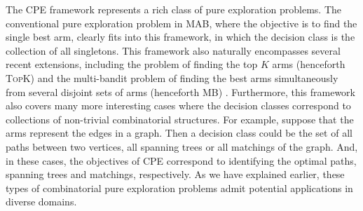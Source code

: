 \documentclass{article}
\newcommand{\Problem}{{CPE}\xspace}
\newcommand{\MultiIdent}{\textsc{TopK}\xspace}
\newcommand{\MultiBandit}{\textsc{MB}\xspace}
\begin{document}
The \Problem framework represents a rich class of pure exploration problems.
The conventional pure exploration problem in MAB, where the objective is to find the single best arm, clearly fits into this framework, in which the decision class is the collection of all singletons. 
This framework also naturally encompasses several recent extensions, including the problem of finding the top $K$ arms (henceforth \MultiIdent) \citep{kalyanakrishnan2010efficient,kalyanakrishnan2012pac,bubeck2013multiple,zhou2014optimal} and the
multi-bandit problem of finding the best arms simultaneously from several disjoint sets of arms (henceforth \MultiBandit) \citep{NIPS2011_4478,bubeck2013multiple}.
Furthermore, this framework also covers many more interesting cases where the decision classes correspond to collections of non-trivial combinatorial structures.
For example, suppose that the arms represent the edges in a graph.
Then a decision class could be the set of all paths between two vertices, all spanning trees or all matchings of the graph. 
And, in these cases, the objectives of \Problem correspond to identifying the optimal paths, spanning trees and matchings, respectively.
As we have explained earlier, these types of combinatorial pure exploration problems admit potential applications in diverse domains.%

\end{document}
